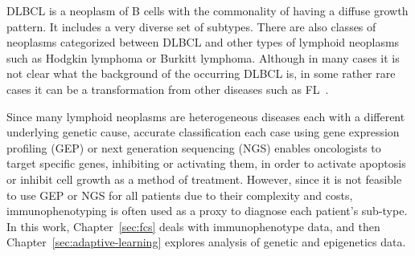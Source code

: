 DLBCL is a neoplasm of B cells with the commonality of having a diffuse growth pattern. It includes a very diverse set of subtypes. There are also classes of neoplasms categorized between DLBCL and other types of lymphoid neoplasms such as Hodgkin lymphoma or Burkitt lymphoma. Although in many cases it is not clear what the background of the occurring DLBCL is, in some rather rare cases it can be a transformation from other diseases such as FL~\cite[Ch. 31, 33]{hoffbrand2016postgraduate}.

Since many lymphoid neoplasms are heterogeneous diseases each with a different underlying genetic cause, accurate classification each case using gene expression profiling (GEP) or next generation sequencing (NGS) enables oncologists to target specific genes, inhibiting or activating them, in order to activate apoptosis or inhibit cell growth as a method of treatment. However, since it is not feasible to use GEP or NGS for all patients due to their complexity and costs, immunophenotyping is often used as a proxy to diagnose each patient's sub-type. In this work, Chapter~\ref{sec:fcs} deals with immunophenotype data, and then Chapter~\ref{sec:adaptive-learning} explores analysis of genetic and epigenetics data.
